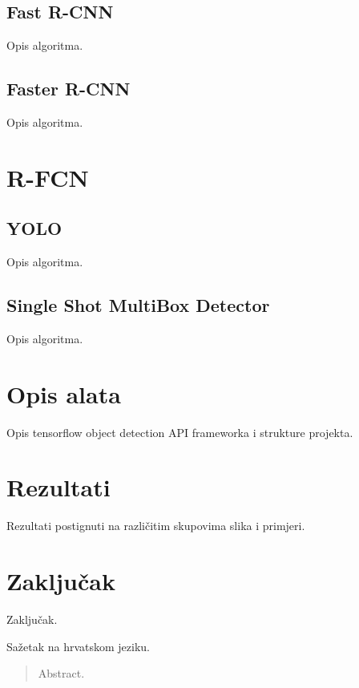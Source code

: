 \documentclass[times, utf8, diplomski]{fer}
\begin{document}
\section{Fast R-CNN}
Opis algoritma.

\section{Faster R-CNN}
Opis algoritma.

\chapter{R-FCN}

\section{YOLO}
Opis algoritma.

\section{Single Shot MultiBox Detector}
Opis algoritma.

\chapter{Opis alata}
Opis tensorflow object detection API frameworka i strukture projekta.

\chapter{Rezultati}
Rezultati postignuti na različitim skupovima slika i primjeri.



\chapter{Zaključak}
Zaključak.





\begin{sazetak}
Sažetak na hrvatskom jeziku.

\end{sazetak}

\begin{abstract}
Abstract.

\end{abstract}
\end{document}
